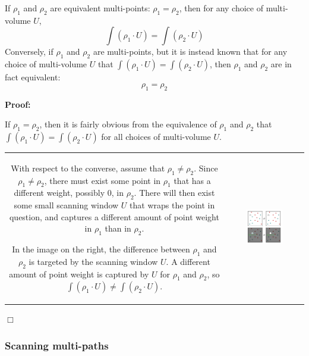 \begin{thm}
If \(\rho_1\) and \(\rho_2\) are equivalent multi-points: \(\rho_1 = \rho_2\), then for any choice of multi-volume \(U\), 
\[\int (\rho_1 \cdot U) = \int (\rho_2 \cdot U)\]
Conversely, if \(\rho_1\) and \(\rho_2\) are multi-points, but it is instead known that for any choice of multi-volume \(U\) that 
\(\int (\rho_1 \cdot U) = \int (\rho_2 \cdot U)\), then \(\rho_1\) and \(\rho_2\) are in fact equivalent:
\[\rho_1 = \rho_2\]  
\end{thm}
\textbf{Proof:}

If \(\rho_1 = \rho_2\), then it is fairly obvious from the equivalence of \(\rho_1\) and \(\rho_2\) that \(\int (\rho_1 \cdot U) = \int (\rho_2 \cdot U)\) for all choices of multi-volume \(U\). 

\begin{tabular}{cc}
\parbox{0.5\textwidth}{
With respect to the converse, assume that \(\rho_1 \neq \rho_2\). Since \(\rho_1 \neq \rho_2\), there must exist some point in \(\rho_1\) that has a different weight, possibly \(0\), in \(\rho_2\). There will then exist some small scanning window \(U\) that wraps the point in question, and captures a different amount of point weight in \(\rho_1\) than in \(\rho_2\).

In the image on the right, the difference between \(\rho_1\) and \(\rho_2\) is targeted by the scanning window \(U\). A different amount of point weight is captured by \(U\) for \(\rho_1\) and \(\rho_2\), so \(\int (\rho_1 \cdot U) \neq \int (\rho_2 \cdot U)\).
} & \parbox{0.5\textwidth}{
\includegraphics[width = 0.5\textwidth]{Point_totals/scanning_points_using_volumes}
}
\end{tabular}

\(\Box\)

\subsubsection{Scanning multi-paths}

